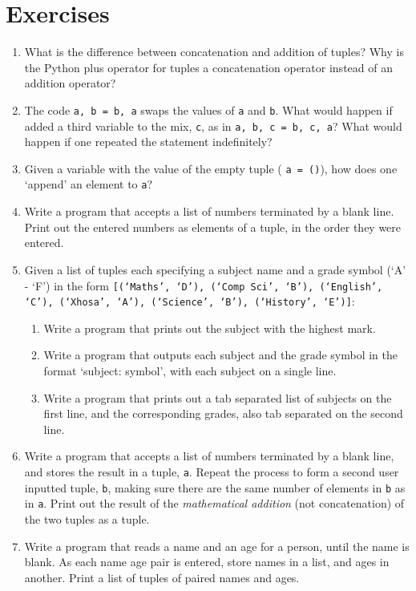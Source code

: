 \section{Exercises}
\begin{enumerate}
	\item What is the difference between concatenation and addition of    tuples? Why is the Python plus operator for tuples a concatenation    operator instead of an addition operator?
	\item The code 
\texttt{a, b = b, a} swaps the values of \texttt{a}    and \texttt{b}. What would happen if added a third variable to the    mix, \texttt{c}, as in 
\texttt{a, b, c = b, c, a}? What would    happen if one repeated the statement indefinitely?
	\item Given a variable with the value of the empty tuple (
\texttt{a =    ()}), how does one `append' an element to \texttt{a}?
	\item Write a program that accepts a list of numbers terminated by a    blank line. Print out the entered numbers as elements of a tuple, in    the order they were entered.
	\item Given a list of tuples each specifying a subject name and a    grade symbol (`A' - `F') in the form 
\texttt{[(`Maths', `D'),    (`Comp Sci', `B'), (`English', `C'), (`Xhosa', `A'),    (`Science', `B'), (`History', `E')]}: 
\begin{enumerate}
	\item Write a program that prints out the subject with the highest     mark.
	\item Write a program that outputs each subject and the grade     symbol in the format `subject: symbol', with each subject on a     single line.
	\item Write a program that prints out a tab separated list of     subjects on the first line, and the corresponding grades, also     tab separated on the second line.
\end{enumerate}
	\item Write a program that accepts a list of numbers terminated by a    blank line, and stores the result in a tuple, \texttt{a}. Repeat the    process to form a second user inputted tuple, \texttt{b}, making    sure there are the same number of elements in \texttt{b} as in    \texttt{a}. Print out the result of the \textit{mathematical    addition} (not concatenation) of the two tuples as a    tuple.
	\item Write a program that reads a name and an age for a person, until    the name is blank. As each name age pair is entered, store names in    a list, and ages in another. Print a list of tuples of paired names    and ages.

\end{enumerate}
